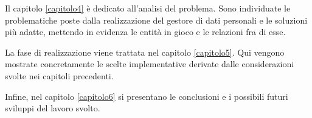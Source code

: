 Il capitolo \ref{capitolo4} \`e dedicato all'analisi del problema. Sono individuate le problematiche poste dalla realizzazione del gestore di dati personali e le soluzioni pi\`u adatte, mettendo in evidenza le entit\`a in gioco e le relazioni fra di esse.

La fase di realizzazione viene trattata nel capitolo \ref{capitolo5}. Qui vengono mostrate concretamente le scelte implementative derivate dalle considerazioni svolte nei capitoli precedenti.

Infine, nel capitolo \ref{capitolo6} si presentano le conclusioni e i possibili futuri sviluppi del lavoro svolto.


